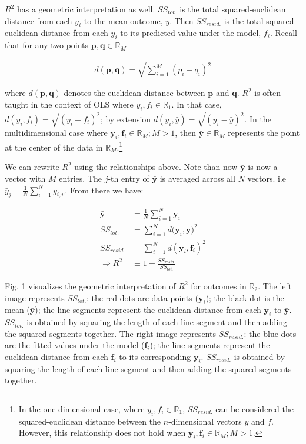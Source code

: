 \documentclass[conference,final,]{IEEEtran}
\begin{document}
\(R^2\) has a geometric interpretation as well. \(SS_{tot.}\) is the
total squared-euclidean distance from each \(y_i\) to the mean outcome,
\(\bar{y}\). Then \(SS_{resid.}\) is the total squared-euclidean
distance from each \(y_i\) to its predicted value under the model,
\(f_i\). Recall that for any two points
\(\mathbf{p}, \mathbf{q} \in \mathbb{R}_M\)

\begin{align}
    d(\mathbf{p},\mathbf{q}) = \sqrt{\sum_{i=1}^M{(p_i - q_i)^2}}
\end{align}

where \(d(\mathbf{p}, \mathbf{q})\) denotes the euclidean distance
between \(\mathbf{p}\) and \(\mathbf{q}\). \(R^2\) is often taught in
the context of OLS where \(y_i, f_i \in \mathbb{R}_1\). In that case,
\(d(y_i, f_i) = \sqrt{(y_i - f_i)^2}\); by extension
\(d(y_i, \bar{y}) = \sqrt{(y_i - \bar{y})^2}\). In the multidimensional
case where \(\mathbf{y}_i, \mathbf{f}_i \in \mathbb{R}_M; M > 1\), then
\(\bar{\mathbf{y}} \in \mathbb{R}_M\) represents the point at the center
of the data in \(\mathbb{R}_M\).\footnote{In the one-dimensional case,
  where \(y_i , f_i \in \mathbb{R}_1\), \(SS_{resid.}\) can be
  considered the squared-euclidean distance between the
  \(n\)-dimensional vectors \(y\) and \(f\). However, this relationship
  does not hold when
  \(\mathbf{y}_i , \mathbf{f}_i \in \mathbb{R}_M ; M > 1\).}

We can rewrite \(R^2\) using the relationships above. Note than now
\(\bar{\mathbf{y}}\) is now a vector with \(M\) entries. The \(j\)-th
entry of \(\bar{\mathbf{y}}\) is averaged across all \(N\) vectors. i.e
\(\bar{y}_j = \frac{1}{N} \sum_{i=1}^{N} y_{i,v}\). From there we have:

\begin{align}
    \bar{\mathbf{y}} &= \frac{1}{N} \sum_{i=1}^{N} \mathbf{y}_i \\ 
    SS_{tot.} &= \sum_{i=1}^N{d(\mathbf{y}_i, \bar{\mathbf{y}}})^2\\
    SS_{resid.} &= \sum_{i=1}^N{d(\mathbf{y}_i, \mathbf{f}_i)^2}\\
    \Rightarrow R^2 & \equiv 1 - \frac{SS_{resid.}}{SS_{tot.}}
\end{align}

Fig. 1 visualizes the geometric interpretation of \(R^2\) for outcomes
in \(\mathbb{R}_2\). The left image represents \(SS_{tot.}\): the red
dots are data points (\(\mathbf{y}_i\)); the black dot is the mean
(\(\bar{\mathbf{y}}\)); the line segments represent the euclidean
distance from each \(\mathbf{y}_i\) to \(\bar{\mathbf{y}}\).
\(SS_{tot.}\) is obtained by squaring the length of each line segment
and then adding the squared segments together. The right image
represents \(SS_{resid.}\): the blue dots are the fitted values under
the model (\(\mathbf{f}_i\)); the line segments represent the euclidean
distance from each \(\mathbf{f}_i\) to its corresponding
\(\mathbf{y}_i\). \(SS_{resid.}\) is obtained by squaring the length of
each line segment and then adding the squared segments together.
\end{document}
